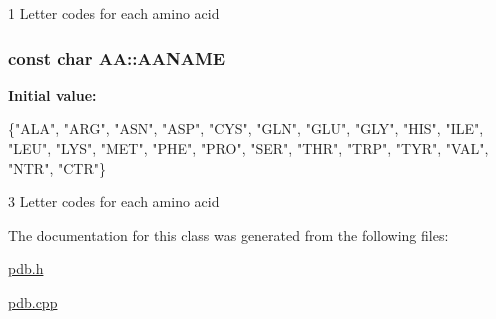 1 Letter codes for each amino acid 

\hypertarget{classAA_a979027b32adbcc9f5eabeaf580d243b6}{
\subsubsection[{A\-A\-N\-A\-M\-E}]{\setlength{\rightskip}{0pt plus 5cm}const char A\-A\-::\-A\-A\-N\-A\-M\-E\hspace{0.3cm}{\ttfamily [static]}}}\label{classAA_a979027b32adbcc9f5eabeaf580d243b6}
{\bfseries Initial value\-:}
\begin{DoxyCode}
 \{\textcolor{stringliteral}{"ALA"}, \textcolor{stringliteral}{"ARG"}, \textcolor{stringliteral}{"ASN"}, \textcolor{stringliteral}{"ASP"}, \textcolor{stringliteral}{"CYS"}, \textcolor{stringliteral}{"GLN"}, 
                 \textcolor{stringliteral}{"GLU"}, \textcolor{stringliteral}{"GLY"}, \textcolor{stringliteral}{"HIS"}, \textcolor{stringliteral}{"ILE"}, \textcolor{stringliteral}{"LEU"}, \textcolor{stringliteral}{"LYS"}, 
                 \textcolor{stringliteral}{"MET"}, \textcolor{stringliteral}{"PHE"}, \textcolor{stringliteral}{"PRO"}, \textcolor{stringliteral}{"SER"}, \textcolor{stringliteral}{"THR"}, \textcolor{stringliteral}{"TRP"}, 
                 \textcolor{stringliteral}{"TYR"}, \textcolor{stringliteral}{"VAL"}, \textcolor{stringliteral}{"NTR"}, \textcolor{stringliteral}{"CTR"}\}
\end{DoxyCode}


3 Letter codes for each amino acid 



The documentation for this class was generated from the following files\-:\begin{DoxyCompactItemize}
\item 
\hyperlink{pdb_8h}{pdb.\-h}\item 
\hyperlink{pdb_8cpp}{pdb.\-cpp}\end{DoxyCompactItemize}
